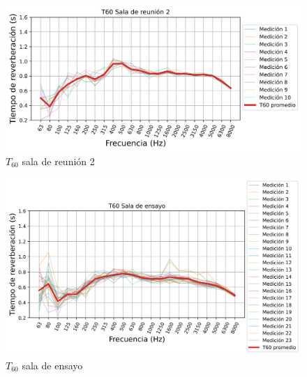 \begin{figure}[H]
    \centering
    \includegraphics[width=12cm]{Imagenes/Resultados/T60_Sala_reunion_2.png}
    \caption{$T_{60}$ sala de reunión 2}
    \label{fig: T60 sala2}
\end{figure}

\begin{figure}[H]
    \centering
    \includegraphics[width=12cm]{Imagenes/Resultados/T60_Sala_de_ensayo.png}
    \caption{$T_{60}$ sala de ensayo}
    \label{fig: T60 sala de ensayo}
\end{figure}